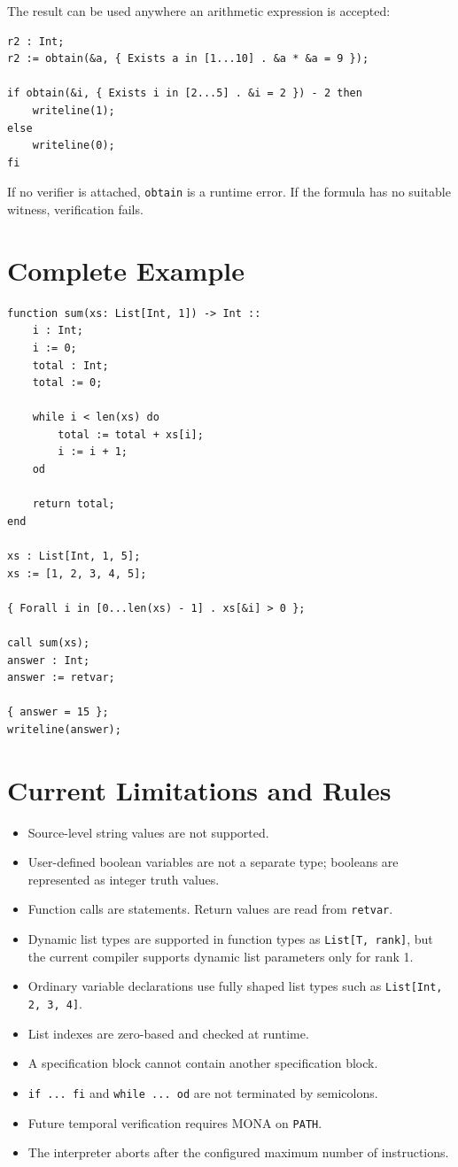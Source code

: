 \documentclass[11pt]{article}
\begin{document}
The result can be used anywhere an arithmetic expression is accepted:

\begin{lstlisting}
r2 : Int;
r2 := obtain(&a, { Exists a in [1...10] . &a * &a = 9 });

if obtain(&i, { Exists i in [2...5] . &i = 2 }) - 2 then
    writeline(1);
else
    writeline(0);
fi
\end{lstlisting}

If no verifier is attached, \texttt{obtain} is a runtime error. If the formula has no suitable witness, verification fails.

\section{Complete Example}

\begin{lstlisting}
function sum(xs: List[Int, 1]) -> Int ::
    i : Int;
    i := 0;
    total : Int;
    total := 0;

    while i < len(xs) do
        total := total + xs[i];
        i := i + 1;
    od

    return total;
end

xs : List[Int, 1, 5];
xs := [1, 2, 3, 4, 5];

{ Forall i in [0...len(xs) - 1] . xs[&i] > 0 };

call sum(xs);
answer : Int;
answer := retvar;

{ answer = 15 };
writeline(answer);
\end{lstlisting}

\section{Current Limitations and Rules}

\begin{itemize}
  \item Source-level string values are not supported.
  \item User-defined boolean variables are not a separate type; booleans are represented as integer truth values.
  \item Function calls are statements. Return values are read from \texttt{retvar}.
  \item Dynamic list types are supported in function types as \texttt{List[T, rank]}, but the current compiler supports dynamic list parameters only for rank 1.
  \item Ordinary variable declarations use fully shaped list types such as \texttt{List[Int, 2, 3, 4]}.
  \item List indexes are zero-based and checked at runtime.
  \item A specification block cannot contain another specification block.
  \item \texttt{if ... fi} and \texttt{while ... od} are not terminated by semicolons.
  \item Future temporal verification requires MONA on \texttt{PATH}.
  \item The interpreter aborts after the configured maximum number of instructions.
\end{itemize}
\end{document}
